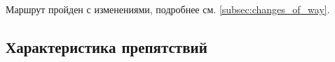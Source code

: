 		Маршрут пройден с изменениями, подробнее см. \ref{subsec:changes_of_way}.

	
	\subsection{Характеристика препятствий}\label{subsec:main_obstacles}
		\subsubsection*{%
%
%		
%		
%
}

